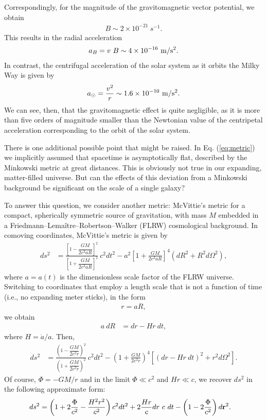 \documentclass{ws-ijmpd}
\begin{document}
Correspondingly, for the magnitude of the gravitomagnetic vector potential, we obtain
\begin{align}
B\sim 2\times 10^{-21}~s^{-1}.
\end{align}
This results in the radial acceleration
\begin{align}
a_B=v~B\sim 4\times 10^{-16}~{\rm m}/{\rm s}^2.
\end{align}
In contrast, the centrifugal acceleration of the solar system as it orbits the Milky Way is given by
\begin{align}
a_\odot=\frac{v^2}{r}\sim 1.6\times 10^{-10}~{\rm m}/{\rm s}^2.
\end{align}
We can see, then, that the gravitomagnetic effect is quite negligible, as it is more than five orders of magnitude smaller than the Newtonian value of the centripetal acceleration corresponding to the orbit of the solar system.

There is one additional possible point that might be raised. In Eq. (\ref{eq:metric}) we implicitly assumed that spacetime is asymptotically flat, described by the Minkowski metric at great distances. This is obviously not true in our expanding, matter-filled universe. But can the effects of this deviation from a Minkowski background be significant on the scale of a single galaxy?

To answer this question, we consider another metric: McVittie's metric\cite{McVittie1933,SKMHH2003} for a compact, spherically symmetric source of gravitation, with mass $M$ embedded in a Friedmann--Lema\^itre--Robertson--Walker (FLRW) cosmological background. In comoving coordinates, McVittie's metric is given by
\begin{align}
ds^2 &= \frac{\left[1 - \dfrac{GM}{2c^2aR}\right]^2}{\left[1 + \dfrac{GM}{2c^2aR}\right]^2}~c^2dt^2 - a^2\left[1 + \frac{GM}{2c^2aR}\right]^4 (dR^2 + R^2 d\Omega^2),
\end{align}
where $a=a(t)$ is the dimensionless scale factor of the FLRW universe. Switching to coordinates that employ a length scale that is not a function of time (i.e., no expanding meter sticks), in the form
\begin{align}
r = aR,
\end{align}
we obtain
\begin{align}
a~dR &= dr - Hr~dt,
\end{align}
where $H=\dot{a}/a$. Then,
\begin{align}
ds^2 &= \frac{\left(1 - \dfrac{GM}{2c^2r}\right)^2}{\left(1 + \dfrac{GM}{2c^2r}\right)^2}~c^2dt^2 - \left(1 + \frac{GM}{2c^2r}\right)^4 [(dr - Hr~dt)^2 + r^2d\Omega^2 ].
\end{align}
Of course, $\Phi=-GM/r$ and in the limit $\Phi\ll c^2$ and $Hr\ll c$, we recover $ds^2$ in the following approximate form:
\begin{align}
ds^2 &= \left(1 + 2\frac{\Phi}{c^2}-\frac{H^2r^2}{c^2}\right)c^2dt^2+2\frac{Hr}{c}dr~ c~dt- \left(1 - 2\frac{\Phi}{c^2}\right) d{\bf r}^2.
\end{align}
\end{document}
